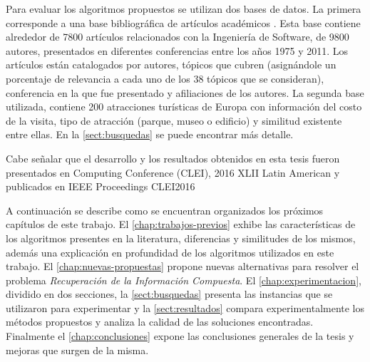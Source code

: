 Para evaluar los algoritmos propuestos se utilizan dos bases de datos. La primera corresponde a una base bibliográfica de artículos académicos \cite{dataDrive}. Esta base contiene alrededor de 7800 artículos relacionados con la Ingeniería de Software, de 9800 autores, presentados en diferentes conferencias entre los años 1975 y 2011. Los artículos están catalogados por autores, tópicos que cubren (asignándole un porcentaje de relevancia a cada uno de los 38 tópicos que se consideran), conferencia en la que fue presentado y afiliaciones de los autores. La segunda base utilizada, contiene 200 atracciones turísticas de Europa con información del costo de la visita, tipo de atracción (parque, museo o edificio) y similitud existente entre ellas. En la \autoref{sect:busquedas} se puede encontrar más detalle.

Cabe señalar que el desarrollo y los resultados obtenidos en esta tesis fueron presentados en  Computing Conference (CLEI), 2016 XLII Latin American y publicados en IEEE Proceedings CLEI2016 \cite{7833376}

A continuación se describe como se encuentran organizados los próximos capítulos de este trabajo. El \autoref{chap:trabajos-previos} exhibe las características de los algoritmos presentes en la literatura, diferencias y similitudes de los mismos, además una explicación en profundidad de los algoritmos utilizados en este trabajo. El \autoref{chap:nuevas-propuestas} propone nuevas alternativas para resolver el problema {\em Recuperación de la Información Compuesta}. El \autoref{chap:experimentacion}, dividido en dos secciones, la \autoref{sect:busquedas} presenta las instancias que se utilizaron para experimentar y la \autoref{sect:resultados} compara experimentalmente los métodos propuestos y analiza la calidad de las soluciones encontradas. Finalmente el \autoref{chap:conclusiones} expone las conclusiones generales de la tesis y mejoras que surgen de la misma.
